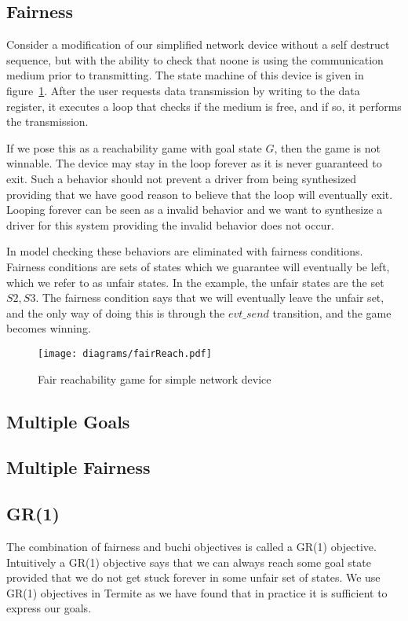 \subsection{Fairness}

Consider a modification of our simplified network device without a self destruct sequence, but with the ability to check that noone is using the communication medium prior to transmitting. The state machine of this device is given in figure~\ref{fig:fair}. After the user requests data transmission by writing to the data register, it executes a loop that checks if the medium is free, and if so, it performs the transmission. 

If we pose this as a reachability game with goal state $G$, then the game is not winnable. The device may stay in the loop forever as it is never guaranteed to exit. Such a behavior should not prevent a driver from being synthesized providing that we have good reason to believe that the loop will eventually exit. Looping forever can be seen as a invalid behavior and we want to synthesize a driver for this system providing the invalid behavior does not occur. 

In model checking these behaviors are eliminated with fairness conditions. Fairness conditions are sets of states which we guarantee will eventually be left, which we refer to as unfair states. In the example, the unfair states are the set ${S2, S3}$. The fairness condition says that we will eventually leave the unfair set, and the only way of doing this is through the $evt\_send$ transition, and the game becomes winning.

\begin{figure}[t]
\centering
\texttt{[image: diagrams/fairReach.pdf]}
\caption{Fair reachability game for simple network device}
\label{fig:fair}
\end{figure}

\subsection{Multiple Goals}

\subsection{Multiple Fairness}

\subsection{GR(1)}

The combination of fairness and buchi objectives is called a GR(1) objective. Intuitively a GR(1) objective says that we can always reach some goal state provided that we do not get stuck forever in some unfair set of states. We use GR(1) objectives in Termite as we have found that in practice it is sufficient to express our goals.

